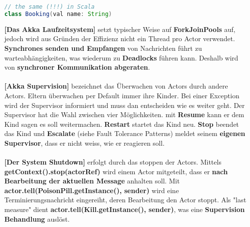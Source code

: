\documentclass[8pt]{extarticle}
\let\oldtextbf\textbf
\renewcommand{\textbf}{\tiny\oldtextbf}
\begin{document}
\begin{multicols*}{5}
\begin{lstlisting}[language=java]
// the same (!!!) in Scala
class Booking(val name: String)
\end{lstlisting}
\textbf{[Das Akka Laufzeitsystem]} setzt typischer Weise auf \textbf{ForkJoinPools} auf, jedoch wird aus Gründen der Effizienz nicht ein Thread pro Actor verwendet. \textbf{Synchrones senden und Empfangen} von Nachrichten führt zu warteabhängigkeiten, was wiederum zu \textbf{Deadlocks} führen kann. Deshalb wird von \textbf{synchroner Kommunikation abgeraten}.\\\\
\textbf{[Akka Supervision]} bezeichnet das Überwachen von Actors durch andere Actors. Eltern überwachen per Default immer ihre Kinder. Bei einer Exception wird der Supervisor informiert und muss dan entscheiden wie es weiter geht. Der Supervisor hat die Wahl zwischen vier Möglichkeiten. mit \textbf{Resume} kann er dem Kind sagen es soll weitermachen. \textbf{Restart} startet das Kind neu. \textbf{Stop} beendet das Kind und \textbf{Escalate} (siehe Fault Tolerance Patterns) meldet seinem \textbf{eigenen Supervisor}, dass er nicht weiss, wie er reagieren soll.\\\\
\textbf{[Der System Shutdown]} erfolgt durch das stoppen der Actors. Mittels \textbf{getContext().stop(actorRef)} wird einem Actor mitgeteilt, dass er \textbf{nach Bearbeitung der aktuellen Message} anhalten soll. Mit \textbf{actor.tell(PoisonPill.getInstance(), sender)} wird eine Terminierungsnachricht eingereiht, deren Bearbeitung den Actor stoppt. Als "last measure" dient \textbf{actor.tell(Kill.getInstance(), sender)}, was eine \textbf{Supervision Behandlung} auslöst.
\end{multicols*}
\end{document}
